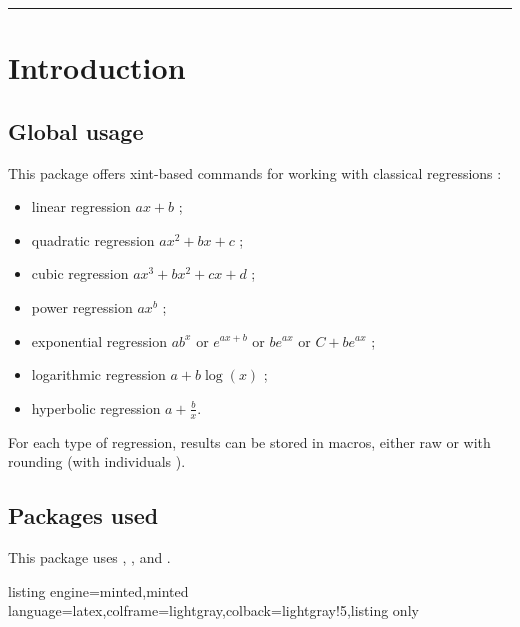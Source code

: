 \documentclass[11pt,a4paper]{ltxdoc}
\begin{document}
\vfill

\vspace*{5mm}

\pagebreak


\hypertarget{matoc}{}

\tableofcontents

\vspace*{5mm}

\hrule

\vspace*{5mm}

\pagebreak

\section{Introduction}

\subsection{Global usage}

This package offers \textsf{xint}-based commands for working with classical regressions :

\begin{itemize}
	\item linear regression $ax+b$ ;
	\item quadratic regression $ax^2+bx+c$ ;
	\item cubic regression $ax^3+bx^2+cx+d$ ;
	\item power regression $ax^b$ ;
	\item exponential regression $ab^x$ or $e^{ax+b}$ or $be^{ax}$ or $C + be^{ax}$ ;
	\item logarithmic regression $a+b\log(x)$ ;
	\item hyperbolic regression $a+\displaystyle\frac{b}{x}$.
\end{itemize}

For each type of regression, results can be stored in macros, either raw or with rounding (with individuals ).

\subsection{Packages used}

This package uses , ,  and .

\begin{tcblisting}{listing engine=minted,minted language=latex,colframe=lightgray,colback=lightgray!5,listing only}
\usepackage{xint-regression}
\end{tcblisting}
\end{document}
